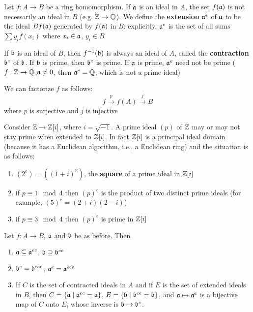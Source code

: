 \documentclass[11pt]{article}
\begin{document}
Let \(f:A\to B\) be a ring homomorphism. If \(\mathfrak{a}\) is an ideal in \(A\), the set \(f(\mathfrak{a})\) is not
necessarily an ideal in \(B\) (e.g. \(\mathbb{Z}\to\mathbb{Q}\)). We define the \textbf{extension} \(\mathfrak{a}^e\) of \(\mathfrak{a}\) to be the
ideal \(Bf(\mathfrak{a})\) generated by \(f(\mathfrak{a})\) in \(B\): explicitly, \(\mathfrak{a}^e\) is the set of all
sums \(\sum y_if(x_i)\) where \(x_i\in\mathfrak{a}\), \(y_i\in B\)

If \(\mathfrak{b}\) is an ideal of \(B\), then \(f^{-1}(\mathfrak{b})\) is always an ideal of \(A\), called the
\textbf{contraction} \(\mathfrak{b}^c\) of \(\mathfrak{b}\). If \(\mathfrak{b}\) is prime, then \(\mathfrak{b}^c\) is prime. If \(\mathfrak{a}\) is prime, \(\mathfrak{a}^e\)
need not be prime (\(f:\mathbb{Z}\to\mathbb{Q}\),\(\mathfrak{a}\neq 0\), then \(\mathfrak{a}^e=\mathbb{Q}\), which is not a prime ideal)

We can factorize \(f\) as follows:
\begin{equation*}
f\xrightarrow{p}f(A)\xrightarrow{j}B
\end{equation*}
where \(p\) is surjective and \(j\) is injective

\begin{examplle}[]
Consider \(\mathbb{Z}\to\mathbb{Z}[i]\), where \(i=\sqrt{-1}\). A prime ideal \((p)\) of \(\mathbb{Z}\) may or may not stay
prime when extended to \(\mathbb{Z}[i]\). In fact \(\mathbb{Z}[i]\) is a principal ideal domain (because it has a
Euclidean algorithm, i.e., a Euclidean ring) and the situation is as follows:
\begin{enumerate}
\item \((2^e)=((1+i)^2)\), the \textbf{square} of a prime ideal in \(\mathbb{Z}[i]\)
\item if \(p\equiv 1\mod 4\) then \((p)^e\) is the product of two distinct prime ideals
(for example, \((5)^e=(2+i)(2-i)\))
\item if \(p\equiv 3\mod 4\) then \((p)^e\) is prime in \(\mathbb{Z}[i]\)
\end{enumerate}
\end{examplle}

Let \(f:A\to B\), \(\mathfrak{a}\) and \(\mathfrak{b}\) be as before. Then
\begin{proposition}[]
\begin{enumerate}
\item \(\mathfrak{a}\subseteq\mathfrak{a}^{ec}\), \(\mathfrak{b}\supseteq\mathfrak{b}^{ce}\)
\item \(\mathfrak{b}^c=\mathfrak{b}^{cec}\), \(\mathfrak{a}^e=\mathfrak{a}^{ece}\)
\item If \(C\) is the set of contracted ideals in \(A\) and if \(E\) is the set of extended ideals
in \(B\), then \(C=\{\mathfrak{a}\mid\mathfrak{a}^{ec}=\mathfrak{a}\}\), \(E=\{\mathfrak{b}\mid\mathfrak{b}^{ce}=\mathfrak{b}\}\), and \(\mathfrak{a}\mapsto\mathfrak{a}^e\) is a bijective map
of \(C\) onto \(E\), whose inverse is \(\mathfrak{b}\mapsto\mathfrak{b}^c\).
\end{enumerate}
\end{proposition}
\end{document}
